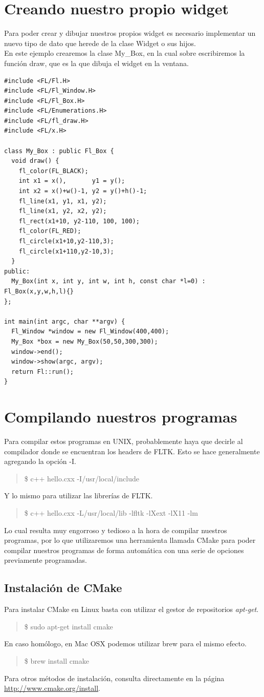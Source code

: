 \documentclass[10pt, oneside]{article}   	%
\begin{document}
\newpage
\section{Creando nuestro propio widget}
Para poder crear y dibujar nuestros propios widget es necesario implementar un nuevo tipo de dato que herede de la clase Widget o sus hijos.\\En este ejemplo crearemos la clase My\_Box, en la cual sobre escribiremos la función draw, que es la que dibuja el widget en la ventana.

\begin{lstlisting}
#include <FL/Fl.H>
#include <FL/Fl_Window.H>
#include <FL/Fl_Box.H>
#include <FL/Enumerations.H>
#include <FL/fl_draw.H>
#include <FL/x.H>

class My_Box : public Fl_Box {
  void draw() {
    fl_color(FL_BLACK);
    int x1 = x(),       y1 = y();
    int x2 = x()+w()-1, y2 = y()+h()-1;
    fl_line(x1, y1, x1, y2);
    fl_line(x1, y2, x2, y2);
    fl_rect(x1+10, y2-110, 100, 100);
    fl_color(FL_RED);
    fl_circle(x1+10,y2-110,3);
    fl_circle(x1+110,y2-10,3);
  }
public: 
  My_Box(int x, int y, int w, int h, const char *l=0) : Fl_Box(x,y,w,h,l){}
};

int main(int argc, char **argv) {
  Fl_Window *window = new Fl_Window(400,400);
  My_Box *box = new My_Box(50,50,300,300);
  window->end();
  window->show(argc, argv);
  return Fl::run();
}
\end{lstlisting}

\newpage
\section{Compilando nuestros programas}
Para compilar estos programas en UNIX, probablemente haya que decirle al compilador donde se encuentran los headers de FLTK. Esto se hace generalmente agregando la opción -I.
\begin{quote}
\$ c++ hello.cxx -I/usr/local/include
\end{quote}
Y lo mismo para utilizar las librerías de FLTK.
\begin{quote}
\$ c++ hello.cxx -L/usr/local/lib -lfltk -lXext -lX11 -lm
\end{quote}
Lo cual resulta muy engorroso y tedioso a la hora de compilar nuestros programas, por lo que utilizaremos una herramienta llamada CMake para poder compilar nuestros programas de forma automática con una serie de opciones previamente programadas.
\subsection{Instalación de CMake}
Para instalar CMake en Linux basta con utilizar el gestor de repositorios \textit{apt-get}.
\begin{quote}
\$ sudo apt-get install cmake
\end{quote}
En caso homólogo, en Mac OSX podemos utilizar brew para el mismo efecto.
\begin{quote}
\$ brew install cmake
\end{quote}
Para otros métodos de instalación, consulta directamente en la página \url{http://www.cmake.org/install}.
\end{document}
